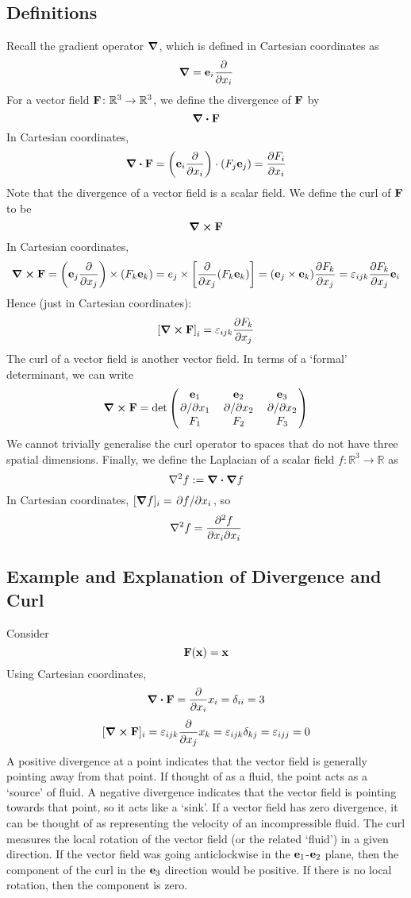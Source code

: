 \subsection{Definitions}
Recall the gradient operator \(\grad\), which is defined in Cartesian coordinates as
\[
	\grad = \vb e_i \frac{\partial}{\partial x_i}
\]
For a vector field \(\vb F \colon \mathbb R^3 \to \mathbb R^3\), we define the divergence of \(\vb F\) by
\[
	\div{\vb F}
\]
In Cartesian coordinates,
\[
	\div{\vb F} = \left( \vb e_i \frac{\partial}{\partial x_i} \right) \cdot (F_j \vb e_j) = \pdv{F_i}{x_i}
\]
Note that the divergence of a vector field is a scalar field.
We define the curl of \(\vb{F}\) to be
\[
	\curl{\vb F}
\]
In Cartesian coordinates,
\[
	\curl{\vb F} = \left( \vb e_j \pdv{x_j} \right) \times (F_k \vb e_k) = e_j \times \left[ \pdv{x_j}(F_k \vb e_k) \right] = (\vb e_j \times \vb e_k) \pdv{F_k}{x_j} = \varepsilon_{ijk} \pdv{F_k}{x_j}\vb e_i
\]
Hence (just in Cartesian coordinates):
\[
	\left[ \curl{\vb F} \right]_i = \varepsilon_{ijk} \pdv{F_k}{x_j}
\]
The curl of a vector field is another vector field.
In terms of a `formal' determinant, we can write
\[
	\curl{\vb F} = \det \begin{pmatrix}
		\vb e_1    & \vb e_2    & \vb e_3    \\
		\pdv*{x_1} & \pdv*{x_2} & \pdv*{x_2} \\
		F_1        & F_2        & F_3
	\end{pmatrix}
\]
We cannot trivially generalise the curl operator to spaces that do not have three spatial dimensions.
Finally, we define the Laplacian of a scalar field \(f \colon \mathbb R^3 \to \mathbb R\) as
\[
	\laplacian{f} := \div{\grad{f}}
\]
In Cartesian coordinates, \([\grad{f}]_i = \pdv*{f}{x_i}\), so
\[
	\laplacian{f} = \pdv{f}{x_i}{x_i}
\]

\subsection{Example and Explanation of Divergence and Curl}
Consider
\[
	\vb F(\vb x) = \vb x
\]
Using Cartesian coordinates,
\[
	\div{\vb F} = \pdv{x_i}x_i = \delta_{ii} = 3
\]
\[
	[\curl{\vb F}]_i = \varepsilon_{ijk} \pdv{x_j} x_k = \varepsilon_{ijk} \delta_{kj} = \varepsilon_{ijj} = 0
\]
A positive divergence at a point indicates that the vector field is generally pointing away from that point.
If thought of as a fluid, the point acts as a `source' of fluid.
A negative divergence indicates that the vector field is pointing towards that point, so it acts like a `sink'.
If a vector field has zero divergence, it can be thought of as representing the velocity of an incompressible fluid.
The curl measures the local rotation of the vector field (or the related `fluid') in a given direction.
If the vector field was going anticlockwise in the \(\vb e_1\)-\(\vb e_2\) plane, then the component of the curl in the \(\vb e_3\) direction would be positive.
If there is no local rotation, then the component is zero.

